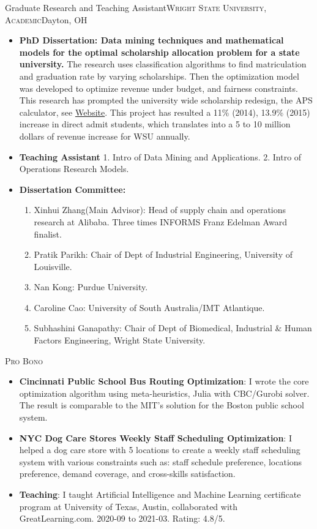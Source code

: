 \documentclass[12pt,a4paper,sans]{moderncv} %
\begin{document}
\bigskip

 {Graduate Research and Teaching
Assistant}{\textsc{Wright State University, Academic}}{Dayton, OH}{}
{}
\begin{itemize}
\item \textbf{PhD Dissertation: Data mining techniques and mathematical models for the optimal scholarship allocation problem for a state university.}
The research uses classification algorithms to find
matriculation and graduation rate by varying scholarships. Then the
optimization model was developed to optimize revenue under budget, and fairness constraints.
This research has prompted the university wide scholarship redesign, the APS
calculator, see \href{http://www.wright.edu/raider-connect/financial-aid/first-year-scholarships}{Website}. 
This project has resulted a 11\% (2014), 13.9\% (2015) increase in direct admit
students, which translates into a 5 to 10 million dollars of revenue increase
for WSU annually.
\item \textbf{Teaching Assistant}
1. Intro of Data Mining and Applications. 
2. Intro of Operations Research Models.
\item \textbf{Dissertation Committee:}
    \begin{enumerate}
\item Xinhui Zhang(Main Advisor): Head of supply chain and operations research at Alibaba. Three times INFORMS Franz Edelman Award finalist.
\item Pratik Parikh: Chair of Dept of Industrial Engineering, University of Louisville.
\item Nan Kong: Purdue University. 
\item Caroline Cao: University of South Australia/IMT Atlantique.
\item Subhashini Ganapathy: Chair of Dept of Biomedical, Industrial \& Human Factors Engineering, Wright State University.
\end{enumerate}
 \end{itemize}
 
\bigskip

{\textsc{Pro Bono}}{}{}{}{
\begin{itemize}
\item \textbf{Cincinnati Public School Bus Routing Optimization}: I wrote the core optimization algorithm using meta-heuristics, Julia with CBC/Gurobi solver. The result is comparable to the MIT's solution for the Boston public school system.
\item \textbf{NYC Dog Care Stores Weekly Staff Scheduling Optimization}: I helped a dog 
care store with 5 locations to create a weekly staff scheduling system with various 
constraints such as: staff schedule preference, locations preference, demand coverage, and cross-skills satisfaction. 
\item \textbf{Teaching}:
    I taught Artificial Intelligence and Machine Learning certificate program at University of Texas, Austin, collaborated with GreatLearning.com. 2020-09 to 2021-03. Rating: 4.8/5.
\end{itemize}


}
\end{document}
